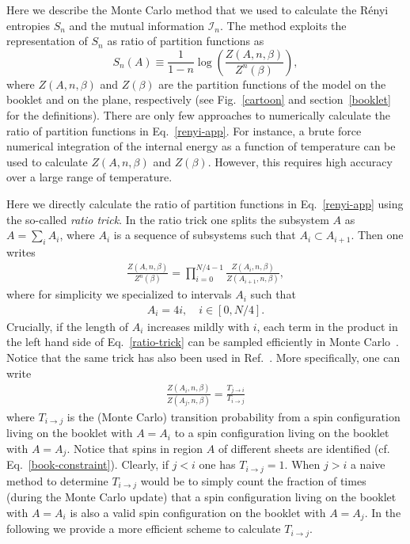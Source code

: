 \documentclass[twocolumn,superscriptaddress,prb,10pt]{revtex4-1}
\begin{document}
Here we describe the Monte Carlo method that we used to calculate the R\'enyi entropies 
$S_n$ and the mutual information ${\mathcal I}_n$. The method exploits the representation 
of $S_n$ as ratio of partition functions as 
%
\begin{equation}
\label{renyi-app}
S_n(A)\equiv \frac{1}{1-n}\log\left(\frac{Z(A,n,\beta)}{Z^n(\beta)}\right),
\end{equation}
%
where $Z(A,n,\beta)$ and $Z(\beta)$ are the partition functions of the model on the booklet and 
on the plane, respectively (see Fig.~\ref{cartoon} and section~\ref{booklet} for the definitions).  
There are only few approaches to numerically calculate the ratio of partition functions in 
Eq.~\eqref{renyi-app}. For instance, a brute force numerical integration of the internal energy as 
a function of temperature\cite{jaconis-2013} can be used to calculate $Z(A,n,\beta)$ and $Z(\beta)$. 
However, this requires high accuracy over a large range of temperature.

Here we directly calculate the ratio of partition functions in Eq.~\eqref{renyi-app} using the 
so-called \emph{ratio trick}. In the ratio trick one splits the subsystem $A$ as $A=\sum_{i}A_i$, 
where $A_i$ is a sequence of subsystems such that $A_i\subset A_{i+1}$. 
Then one writes 
%
\begin{align}
\label{ratio-trick}
\frac{Z(A,n,\beta)}{ Z^n(\beta)} = \prod_{i=0}^{N/4-1} \frac{Z(A_i,n,\beta)}{Z(A_{i+1},n,\beta)},
\end{align}
%
where for simplicity we specialized to intervals $A_i$ such that
%
\begin{align}
\label{sub-choice}
A_i = 4i,\quad i \in [0,N/4] .
\end{align}
%
Crucially, if the length of $A_i$ increases mildly with $i$, each term in the product 
in the left hand side of Eq.~\eqref{ratio-trick} can be sampled efficiently in Monte 
Carlo~\cite{stephan-2014}. Notice that the same trick has also been used in 
Ref.~. More specifically, one can write
%
\begin{align}
\frac{Z(A_i,n,\beta)}{Z(A_{j},n,\beta)} = \frac{T_{j\rightarrow i}}{T_{i\rightarrow j}}
\end{align}
%
where $T_{i\rightarrow j}$  is the (Monte Carlo) transition probability from a spin 
configuration living on the booklet with $A=A_i$ to a spin configuration living on the 
booklet with $A=A_j$. Notice that spins in region $A$ of different sheets are identified 
(cf. Eq.~\eqref{book-constraint}). Clearly, if $j<i$ one has $T_{i\rightarrow j}=1$.
When $j>i$ a naive method to determine $T_{i\rightarrow j}$ would be to simply count the 
fraction of times (during the Monte Carlo update) that a spin configuration living on 
the booklet with $A=A_i$ is also a valid spin configuration on the booklet with $A=A_j$.
In the following we provide a more efficient scheme to calculate $T_{i\rightarrow j}$.
\end{document}
